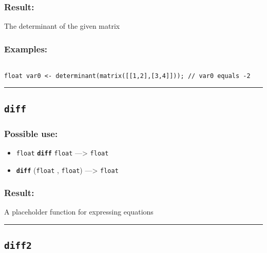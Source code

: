 \documentclass[]{book}
\providecommand{\tightlist}{%
  \setlength{\itemsep}{0pt}\setlength{\parskip}{0pt}}
\theoremstyle{definition}
\theoremstyle{definition}
\theoremstyle{definition}
\theoremstyle{remark}
\begin{document}
\subsubsection{Result:}\label{result-125}

The determinant of the given matrix

\subsubsection{Examples:}\label{examples-99}

\begin{verbatim}
 
float var0 <- determinant(matrix([[1,2],[3,4]])); // var0 equals -2
\end{verbatim}

\begin{center}\rule{0.5\linewidth}{\linethickness}\end{center}

\subsection{\texorpdfstring{\texttt{diff}}{diff}}\label{diff}

\subsubsection{Possible use:}\label{possible-use-130}

\begin{itemize}
\tightlist
\item
  \texttt{float} \textbf{\texttt{diff}} \texttt{float} ---\textgreater{}
  \texttt{float}
\item
  \textbf{\texttt{diff}} (\texttt{float} , \texttt{float})
  ---\textgreater{} \texttt{float}
\end{itemize}

\subsubsection{Result:}\label{result-126}

A placeholder function for expressing equations

\begin{center}\rule{0.5\linewidth}{\linethickness}\end{center}

\subsection{\texorpdfstring{\texttt{diff2}}{diff2}}\label{diff2}
\end{document}
